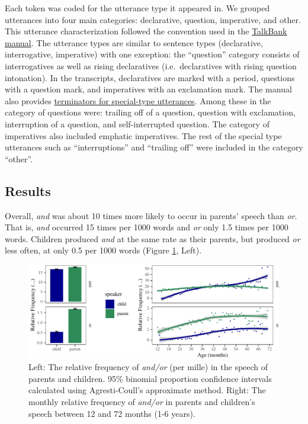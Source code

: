 \documentclass[
  ,man,floatsintext]{apa6}
\begin{document}
Each token was coded for the utterance type it appeared in. We grouped utterances into four main categories: declarative, question, imperative, and other. This utterance characterization followed the convention used in the \href{https://talkbank.org/manuals/CHAT.html\#_Toc486414422}{TalkBank manual}. The utterance types are similar to sentence types (declarative, interrogative, imperative) with one exception: the ``question'' category consists of interrogatives as well as rising declaratives (i.e.~declaratives with rising question intonation). In the transcripts, declaratives are marked with a period, questions with a question mark, and imperatives with an exclamation mark. The manual also provides \href{https://talkbank.org/manuals/CHAT.html\#_Toc486414431}{terminators for special-type utterances}. Among these in the category of questions were: trailing off of a question, question with exclamation, interruption of a question, and self-interrupted question. The category of imperatives also included emphatic imperatives. The rest of the special type utterances such as ``interruptions'' and ``trailing off'' were included in the category ``other''.

\hypertarget{study1results}{%
\subsection{Results}\label{study1results}}

Overall, \emph{and} was about 10 times more likely to occur in parents' speech than \emph{or}. That is, \emph{and} occurred 15 times per 1000 words and \emph{or} only 1.5 times per 1000 words. Children produced \emph{and} at the same rate as their parents, but produced \emph{or} less often, at only 0.5 per 1000 words (Figure \ref{fig:freqPlots}, Left).

\begin{figure}[H]

{\centering \includegraphics{figs/freqPlots-1} 

}

\caption{Left: The relative frequency of \textit{and/or} (per mille) in the speech of parents and children. 95\% binomial proportion confidence intervals calculated using Agresti-Coull's approximate method. Right: The monthly relative frequency of \textit{and/or} in parents and children's speech between 12 and 72 months (1-6 years).}\label{fig:freqPlots}
\end{figure}
\end{document}
